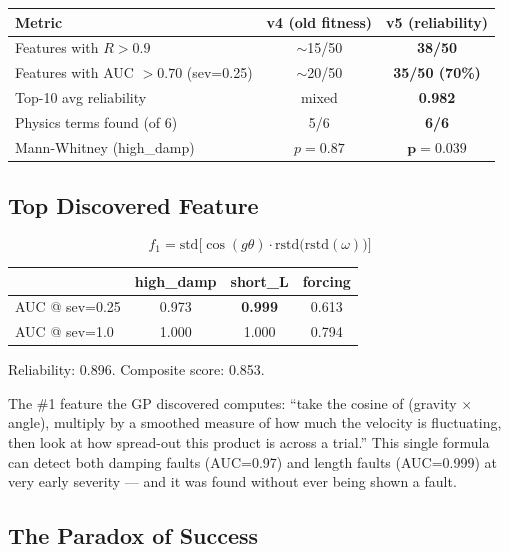 \documentclass[11pt,a4paper]{article}
\begin{document}
\begin{center}
\begin{tabular}{lcc}
\toprule
\textbf{Metric} & \textbf{v4 (old fitness)} & \textbf{v5 (reliability)} \\
\midrule
Features with $R > 0.9$ & $\sim$15/50 & \textbf{38/50} \\
Features with AUC $> 0.70$ (sev=0.25) & $\sim$20/50 & \textbf{35/50 (70\%)} \\
Top-10 avg reliability & mixed & \textbf{0.982} \\
Physics terms found (of 6) & 5/6 & \textbf{6/6} \\
Mann-Whitney (high\_damp) & $p = 0.87$ & $\mathbf{p = 0.039}$ \\
\bottomrule
\end{tabular}
\end{center}

\subsection{Top Discovered Feature}

\begin{equation}
f_1 = \text{std}\Big[\cos(g\theta) \cdot \text{rstd}\big(\text{rstd}(\omega)\big)\Big]
\end{equation}

\begin{center}
\begin{tabular}{lccc}
\toprule
& \textbf{high\_damp} & \textbf{short\_L} & \textbf{forcing} \\
\midrule
AUC @ sev=0.25 & 0.973 & \textbf{0.999} & 0.613 \\
AUC @ sev=1.0 & 1.000 & 1.000 & 0.794 \\
\bottomrule
\end{tabular}
\end{center}

Reliability: 0.896. Composite score: 0.853.

\begin{plainbox}
The \#1 feature the GP discovered computes: ``take the cosine of
(gravity $\times$ angle), multiply by a smoothed measure of how much
the velocity is fluctuating, then look at how spread-out this product is
across a trial.'' This single formula can detect both damping faults (AUC=0.97)
and length faults (AUC=0.999) at very early severity --- and it was found
without ever being shown a fault.
\end{plainbox}

\subsection{The Paradox of Success}
\end{document}
